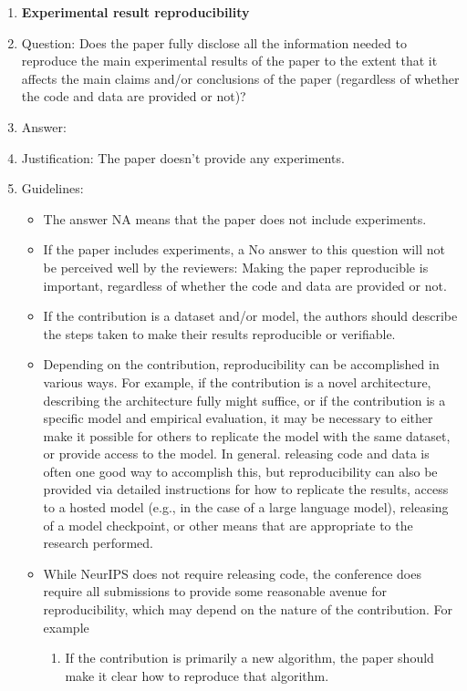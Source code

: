 \documentclass{article}
\begin{document}
\begin{enumerate}
    \item {\bf Experimental result reproducibility}
    \item[] Question: Does the paper fully disclose all the information needed to reproduce the main experimental results of the paper to the extent that it affects the main claims and/or conclusions of the paper (regardless of whether the code and data are provided or not)?
    \item[] Answer: \answerNA{} %
    \item[] Justification: The paper doesn't provide any experiments.
    \item[] Guidelines:
    \begin{itemize}
        \item The answer NA means that the paper does not include experiments.
        \item If the paper includes experiments, a No answer to this question will not be perceived well by the reviewers: Making the paper reproducible is important, regardless of whether the code and data are provided or not.
        \item If the contribution is a dataset and/or model, the authors should describe the steps taken to make their results reproducible or verifiable. 
        \item Depending on the contribution, reproducibility can be accomplished in various ways. For example, if the contribution is a novel architecture, describing the architecture fully might suffice, or if the contribution is a specific model and empirical evaluation, it may be necessary to either make it possible for others to replicate the model with the same dataset, or provide access to the model. In general. releasing code and data is often one good way to accomplish this, but reproducibility can also be provided via detailed instructions for how to replicate the results, access to a hosted model (e.g., in the case of a large language model), releasing of a model checkpoint, or other means that are appropriate to the research performed.
        \item While NeurIPS does not require releasing code, the conference does require all submissions to provide some reasonable avenue for reproducibility, which may depend on the nature of the contribution. For example
        \begin{enumerate}
            \item If the contribution is primarily a new algorithm, the paper should make it clear how to reproduce that algorithm.

\end{enumerate}
\end{itemize}
\end{enumerate}
\end{document}
